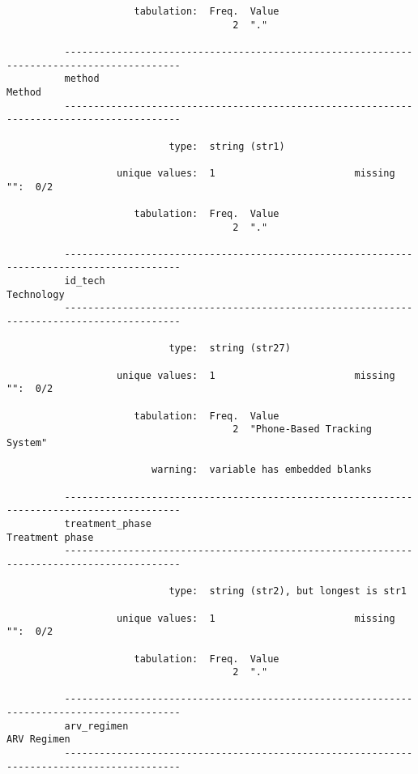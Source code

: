 \documentclass{article}
\begin{document}
\begin{verbatim}
                      tabulation:  Freq.  Value
                                       2  "."
          
          ------------------------------------------------------------------------------------------
          method                                                                              Method
          ------------------------------------------------------------------------------------------
          
                            type:  string (str1)
          
                   unique values:  1                        missing "":  0/2
          
                      tabulation:  Freq.  Value
                                       2  "."
          
          ------------------------------------------------------------------------------------------
          id_tech                                                                         Technology
          ------------------------------------------------------------------------------------------
          
                            type:  string (str27)
          
                   unique values:  1                        missing "":  0/2
          
                      tabulation:  Freq.  Value
                                       2  "Phone-Based Tracking System"
          
                         warning:  variable has embedded blanks
          
          ------------------------------------------------------------------------------------------
          treatment_phase                                                            Treatment phase
          ------------------------------------------------------------------------------------------
          
                            type:  string (str2), but longest is str1
          
                   unique values:  1                        missing "":  0/2
          
                      tabulation:  Freq.  Value
                                       2  "."
          
          ------------------------------------------------------------------------------------------
          arv_regimen                                                                    ARV Regimen
          ------------------------------------------------------------------------------------------
          

\end{verbatim}
\end{document}
